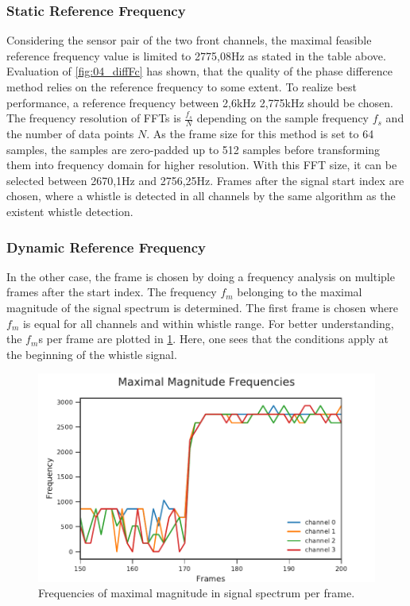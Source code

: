 \subsubsection*{Static Reference Frequency}

Considering the sensor pair of the two front channels, the maximal feasible
reference frequency value is limited to 2775,08\si{\hertz} as stated in the table above.
Evaluation of \cref{fig:04_diffFc} has shown, that the quality of the phase difference
method relies on the reference frequency to some extent.
To realize best performance, a reference frequency between 2,6\si{\kilo\hertz} 2,775\si{\kilo\hertz}
should be chosen.
The frequency resolution of \acp{FFT} is $\frac{f_s}{N}$ depending on the sample frequency $f_s$ and
the number of data points $N$.
As the frame size for this method is set to 64 samples, the samples are zero-padded
up to 512 samples before transforming them into frequency domain for higher resolution.
With this \ac{FFT} size, it can be selected between 2670,1\si{\hertz}
and 2756,25\si{\hertz}.
Frames after the signal start index are chosen, where a whistle is detected
in all channels by the same algorithm as the existent whistle detection.

\subsubsection*{Dynamic Reference Frequency}

In the other case, the frame is chosen by doing a frequency analysis on
multiple frames after the start index.
The frequency $f_m$ belonging to the maximal magnitude of the signal spectrum
is determined.
The first frame is chosen where $f_m$ is equal for all channels and
within whistle range.
For better understanding, the $f_m$s per frame are plotted in \cref{fig:03_maxFreq}.
Here, one sees that the conditions apply at the beginning of the whistle signal.
\begin{figure}[ht]
	\centering
		\includegraphics[]{figures/maxFreq}
	\caption{Frequencies of maximal magnitude in signal spectrum per frame.}
    \label{fig:03_maxFreq}
\end{figure}
